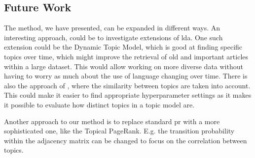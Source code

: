 \subsection{Future Work}\label{sec:future_work}

The method, we have presented, can be expanded in different ways. 
An interesting approach, could be to investigate extensions of \gls{lda}.
One such extension could be the Dynamic Topic Model\cite{blei2006dynamic}, which is good at finding specific topics over time, which might improve the retrieval of old and important articles within a large dataset.
This would allow working on more diverse data without having to worry as much about the use of language changing over time.
There is also the approach of \citeauthor{blei2007correlated}\cite{blei2007correlated}, where the similarity between topics are taken into account.
This could make it easier to find appropriate hyperparameter settings as it makes it possible to evaluate how distinct topics in a topic model are.

Another approach to our method is to replace standard \gls{pr} with a more sophisticated one, like the Topical PageRank\cite{yang2009topic}. 
E.g. the transition probability within the adjacency matrix can be changed to focus on the correlation between topics.
